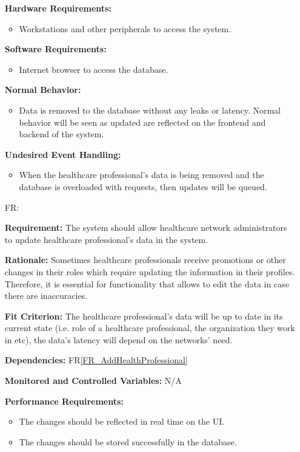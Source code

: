 \documentclass[12pt]{article}
\newcounter{reqnum} %
\begin{document}
\begin{itemize}
\textbf{Hardware Requirements:}
\begin{itemize}
  \item Workstations and other peripherals to access the system.
\end{itemize} 

\textbf{Software Requirements:}
\begin{itemize}
  \item Internet browser to access the database.
\end{itemize} 

\textbf{Normal Behavior:}
\begin{itemize}
  \item Data is removed to the database without any leaks or latency. Normal behavior will be seen as updated are reflected on the frontend and backend of the system.
\end{itemize} 

\textbf{Undesired Event Handling:}
\begin{itemize}
  \item When the healthcare professional’s data is being removed and the database is overloaded with requests, then updates will be queued.
\end{itemize} 

\item[FR\refstepcounter{reqnum}\thereqnum \label{FR_UpdateHealthProfessionals}:]

\textbf{Requirement:} The system should allow healthcare network administrators to update healthcare professional’s data in the system.

\textbf{Rationale:} Sometimes healthcare professionals receive promotions or other changes in their roles which require updating the information in their profiles. Therefore, it is essential for functionality that allows to edit the data in case there are inaccuracies.  

\textbf{Fit Criterion:} The healthcare professional’s data will be up to date in its current state (i.e. role of a healthcare professional, the organization they work in etc), the data’s latency will depend on the networks’ need. 

\textbf{Dependencies:} FR\ref{FR_AddHealthProfessional}

\textbf{Monitored and Controlled Variables:} N/A

\textbf{Performance Requirements:} 
\begin{itemize}
  \item The changes should be reflected in real time on the UI.
  \item The changes should be stored successfully in the database.
\end{itemize} 


\end{itemize}
\end{document}
